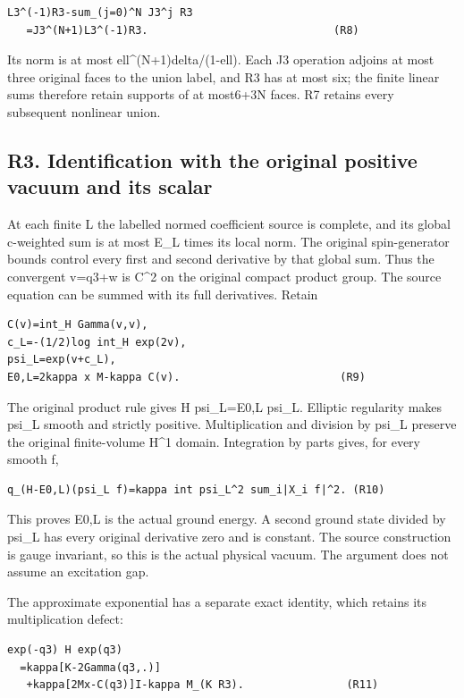 \documentclass[11pt,a4paper]{article}
\renewcommand{\[}{\begingroup\small\originaldisplaystart}
\renewcommand{\]}{\originaldisplayend\endgroup}
\begin{document}
\begin{verbatim}
L3^(-1)R3-sum_(j=0)^N J3^j R3
   =J3^(N+1)L3^(-1)R3.                             (R8)
\end{verbatim}

Its norm is at most ell\^{}(N+1)delta/(1-ell). Each J3 operation adjoins
at most three original faces to the union label, and R3 has at most six;
the finite linear sums therefore retain supports of at most6+3N faces.
R7 retains every subsequent nonlinear union.

\subsection{R3. Identification with the original positive vacuum and its
scalar}\label{r3.-identification-with-the-original-positive-vacuum-and-its-scalar}

At each finite L the labelled normed coefficient source is complete, and
its global c-weighted sum is at most \textbar E\_L\textbar{} times its
local norm. The original spin-generator bounds control every first and
second derivative by that global sum. Thus the convergent v=q3+w is
C\^{}2 on the original compact product group. The source equation can be
summed with its full derivatives. Retain

\begin{verbatim}
C(v)=int_H Gamma(v,v),
c_L=-(1/2)log int_H exp(2v),
psi_L=exp(v+c_L),
E0,L=2kappa x M-kappa C(v).                         (R9)
\end{verbatim}

The original product rule gives H psi\_L=E0,L psi\_L. Elliptic
regularity makes psi\_L smooth and strictly positive. Multiplication and
division by psi\_L preserve the original finite-volume H\^{}1 domain.
Integration by parts gives, for every smooth f,

\begin{verbatim}
q_(H-E0,L)(psi_L f)=kappa int psi_L^2 sum_i|X_i f|^2. (R10)
\end{verbatim}

This proves E0,L is the actual ground energy. A second ground state
divided by psi\_L has every original derivative zero and is constant.
The source construction is gauge invariant, so this is the actual
physical vacuum. The argument does not assume an excitation gap.

The approximate exponential has a separate exact identity, which retains
its multiplication defect:

\begin{verbatim}
exp(-q3) H exp(q3)
  =kappa[K-2Gamma(q3,.)]
   +kappa[2Mx-C(q3)]I-kappa M_(K R3).                (R11)
\end{verbatim}
\end{document}

